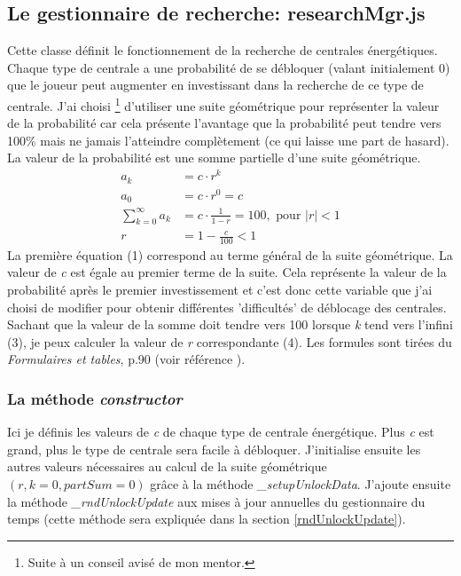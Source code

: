 \documentclass{article}
\begin{document}
		\subsection{Le gestionnaire de recherche: researchMgr.js} \label{researchMgr}
		
		
		Cette classe définit le fonctionnement de la recherche de centrales énergétiques.
		Chaque type de centrale a une probabilité de se débloquer (valant initialement 0) que le joueur peut augmenter en investissant dans la recherche de ce type de centrale. J'ai choisi \footnote{Suite à un conseil avisé de mon mentor.} d'utiliser une suite géométrique pour représenter la valeur de la probabilité car cela présente l'avantage que la probabilité peut tendre vers 100\% mais ne jamais l'atteindre complètement (ce qui laisse une part de hasard).
		La valeur de la probabilité est une somme partielle d'une suite géométrique.
		\begin{align}
  			a_{k} &= c\cdot r^{k} \\
    			a_{0} &= c\cdot r^{0} = c \\
    			\sum_{k=0}^{\infty} a_{k} &= c\cdot \frac{1}{1-r} = 100,\text{ pour } |r|<1 \\
    			r &= 1 - \frac{c}{100} < 1
		\end{align}
		La première équation (1) correspond au terme général de la suite géométrique.
		La valeur de \textit{c} est égale au premier terme de la suite. Cela représente la valeur de la probabilité après le premier investissement et c'est donc cette variable que j'ai choisi de modifier pour obtenir différentes 'difficultés' de déblocage des centrales. Sachant que la valeur de la somme doit tendre vers 100 lorsque \textit{k} tend vers l'infini (3), je peux calculer la valeur de \textit{r} correspondante (4). Les formules sont tirées du \textit{Formulaires et tables}, p.90 (voir référence \cite{FetT}).
		
        
        \subsubsection{La méthode \textit{constructor}}
        Ici je définis les valeurs de \textit{c} de chaque type de centrale énergétique. Plus \textit{c} est grand, plus le type de centrale sera facile à débloquer. J'initialise ensuite les autres valeurs nécessaires au calcul de la suite géométrique $(r, k=0, partSum=0)$ grâce à la méthode \textit{\_setupUnlockData}. J'ajoute ensuite la méthode \textit{\_rndUnlockUpdate} aux mises à jour annuelles du gestionnaire du temps (cette méthode sera expliquée dans la section \ref{rndUnlockUpdate}).
        
\end{document}
